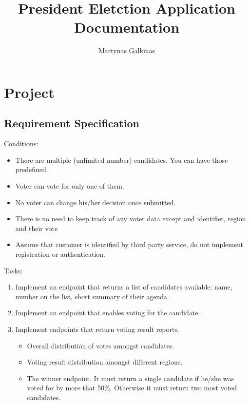 \documentclass[12pt,a4paper]{article}
\title{President Eletction Application Documentation}
\author{Martynas Galkinas}
\begin{document}
\maketitle

\section{Project}
\subsection{Requirement Specification}
Conditions:
\begin{itemize}
    \item
        There are multiple (unlimited number) candidates. You can have those
        predefined.
    \item
        Voter can vote for only one of them.
    \item
        No voter can change his/her decision once submitted.
    \item
        There is no need to keep track of any voter data except and identifier,
        region and their vote
    \item
        Assume that customer is identified by third party service, do not
        implement registration or authentication.
\end{itemize}


Tasks:
\begin{enumerate}
    \item
        Implement an endpoint that returns a list of candidates available:
             name,
             number on the list,
             short summary of their agenda.
    \item
        Implement an endpoint that enables voting for the candidate.
    \item
        Implement endpoints that return voting result reports.
        \begin{itemize}
            \item Overall distribution of votes amongst candidates.
            \item Voting result distribution amongst different regions.
            \item The winner endpoint. It must return a single candidate
                if he/she was voted for by more that 50\%. Otherwise
                it must return two most voted candidates.
        \end{itemize}
\end{enumerate}
\end{document}
